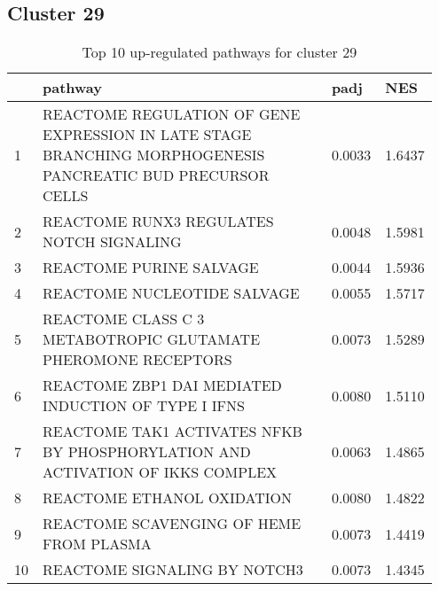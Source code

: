 \documentclass{article}
\begin{document}
\subsection{Cluster 29 }
\begin{table}[H]
\centering
\begin{tabular}{p{0.05\linewidth}p{0.7\linewidth}p{0.1\linewidth}p{0.1\linewidth}}
  \hline
 & pathway & padj & NES \\ 
  \hline
1 & REACTOME REGULATION OF GENE EXPRESSION IN LATE STAGE BRANCHING MORPHOGENESIS PANCREATIC BUD PRECURSOR CELLS & 0.0033 & 1.6437 \\ 
  2 & REACTOME RUNX3 REGULATES NOTCH SIGNALING & 0.0048 & 1.5981 \\ 
  3 & REACTOME PURINE SALVAGE & 0.0044 & 1.5936 \\ 
  4 & REACTOME NUCLEOTIDE SALVAGE & 0.0055 & 1.5717 \\ 
  5 & REACTOME CLASS C 3 METABOTROPIC GLUTAMATE PHEROMONE RECEPTORS & 0.0073 & 1.5289 \\ 
  6 & REACTOME ZBP1 DAI MEDIATED INDUCTION OF TYPE I IFNS & 0.0080 & 1.5110 \\ 
  7 & REACTOME TAK1 ACTIVATES NFKB BY PHOSPHORYLATION AND ACTIVATION OF IKKS COMPLEX & 0.0063 & 1.4865 \\ 
  8 & REACTOME ETHANOL OXIDATION & 0.0080 & 1.4822 \\ 
  9 & REACTOME SCAVENGING OF HEME FROM PLASMA & 0.0073 & 1.4419 \\ 
  10 & REACTOME SIGNALING BY NOTCH3 & 0.0073 & 1.4345 \\ 
   \hline
\end{tabular}
\caption{Top 10 up-regulated pathways for cluster 29} 
\label{tab:q3_2_29}
\end{table}
\end{document}
